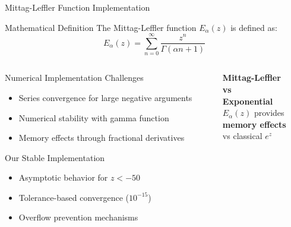 \documentclass[aspectratio=169]{beamer}
\newcommand{\highlight}[1]{\textcolor{kentech_orange}{\textbf{#1}}}
\begin{document}
\begin{frame}{Mittag-Leffler Function Implementation}
    \begin{block}{Mathematical Definition}
        The Mittag-Leffler function $E_\alpha(z)$ is defined as:
        \[
        E_\alpha(z) = \sum_{n=0}^{\infty} \frac{z^n}{\Gamma(\alpha n + 1)}
        \]
    \end{block}
    
    \begin{columns}
        \begin{column}{0.6\textwidth}
            \begin{block}{Numerical Implementation Challenges}
                \begin{itemize}
                    \item Series convergence for large negative arguments
                    \item Numerical stability with gamma function
                    \item Memory effects through fractional derivatives
                \end{itemize}
            \end{block}
            
            \begin{block}{Our Stable Implementation}
                \begin{itemize}
                    \item Asymptotic behavior for $z < -50$
                    \item Tolerance-based convergence ($10^{-15}$)
                    \item Overflow prevention mechanisms
                \end{itemize}
            \end{block}
        \end{column}
        
        \begin{column}{0.4\textwidth}
            \begin{center}
                \textcolor{kentech_blue}{\textbf{Mittag-Leffler}}\\
                \textcolor{kentech_blue}{\textbf{vs}}\\
                \textcolor{kentech_blue}{\textbf{Exponential}}\\
                \vspace{0.5cm}
                $E_\alpha(z)$ provides\\
                \highlight{memory effects}\\
                vs classical $e^z$
            \end{center}
        \end{column}
    \end{columns}
\end{frame}
\end{document}

